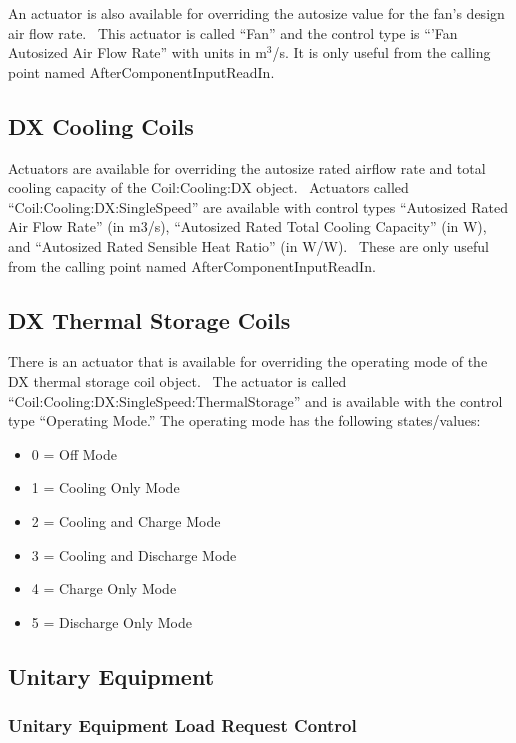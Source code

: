 An actuator is also available for overriding the autosize value for the fan's design air flow rate.~ This actuator is called ``Fan'' and the control type is ``'Fan Autosized Air Flow Rate'' with units in m\(^{3}\)/s. It is only useful from the calling point named AfterComponentInputReadIn.

\subsection{DX Cooling Coils}\label{dx-cooling-coils}

Actuators are available for overriding the autosize rated airflow rate and total cooling capacity of the Coil:Cooling:DX object.~ Actuators called ``Coil:Cooling:DX:SingleSpeed'' are available with control types ``Autosized Rated Air Flow Rate'' (in m3/s), ``Autosized Rated Total Cooling Capacity'' (in W), and ``Autosized Rated Sensible Heat Ratio'' (in W/W).~ These are only useful from the calling point named AfterComponentInputReadIn.

\subsection{DX Thermal Storage Coils}\label{dx-thermal-storage-coils}

There is an actuator that is available for overriding the operating mode of the DX thermal storage coil object.~ The actuator is called ``Coil:Cooling:DX:SingleSpeed:ThermalStorage'' and is available with the control type ``Operating Mode.''  The operating mode has the following states/values:

\begin{itemize}
\item
0 = Off Mode
\item
1 = Cooling Only Mode
\item
2 = Cooling and Charge Mode
\item
3 = Cooling and Discharge Mode
\item
4 = Charge Only Mode
\item
5 = Discharge Only Mode
\end{itemize}

\subsection{Unitary Equipment}\label{unitary-equipment}

\subsubsection{Unitary Equipment Load Request Control}\label{unitary-equipment-load-request-ctrl}


